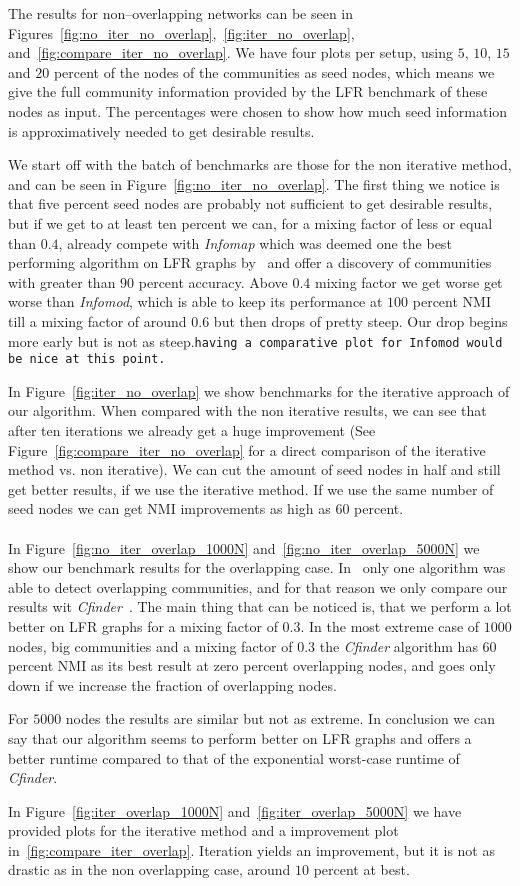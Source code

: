 The results for non--overlapping networks can be seen in Figures~\ref{fig:no_iter_no_overlap},~\ref{fig:iter_no_overlap}, and~\ref{fig:compare_iter_no_overlap}. We have four plots per setup, using $5$, $10$, $15$ and $20$ percent of the nodes of the communities as seed nodes, which means we give the full community information provided by the LFR benchmark of these nodes as input. The percentages were chosen to show how much seed information is approximatively needed to get desirable results.

We start off with the batch of benchmarks are those for the non iterative method, and can be seen in Figure~\ref{fig:no_iter_no_overlap}. The first thing we notice is that five percent seed nodes are probably not sufficient to get desirable results, but if we get to at least ten percent we can, for a mixing factor of less or equal than $0.4$, already compete with \textit{Infomap} which was deemed one the best performing algorithm on LFR graphs by~\cite{LF09} and offer a discovery of communities with greater than $90$ percent accuracy. Above $0.4$ mixing factor we get worse get worse than \textit{Infomod}, which is able to keep its performance at $100$ percent NMI till a mixing factor of around $0.6$ but then drops of pretty steep. Our drop begins more early but is not as steep.\texttt{having a comparative plot for Infomod would be nice at this point.}

In Figure~\ref{fig:iter_no_overlap} we show benchmarks for the iterative approach of our algorithm. When compared with the non iterative results, we can see that after ten iterations we already get a huge improvement (See Figure~\ref{fig:compare_iter_no_overlap} for a direct comparison of the iterative method vs. non iterative). We can cut the amount of seed nodes in half and still get better results, if we use the iterative method. If we use the same number of seed nodes we can get NMI improvements as high as $60$ percent.\\ \\
In Figure~\ref{fig:no_iter_overlap_1000N} and~\ref{fig:no_iter_overlap_5000N} we show our benchmark results for the overlapping case. In~\cite{LF09} only one algorithm was able to detect overlapping communities, and for that reason we only compare our results wit \textit{Cfinder}~\cite{PDFV05}. The main thing that can be noticed is, that we perform a lot better on LFR graphs for a mixing factor of $0.3$. In the most extreme case of $1000$ nodes, big communities and a mixing factor of $0.3$ the \textit{Cfinder} algorithm has $60$ percent NMI as its best result at zero percent overlapping nodes, and goes only down if we increase the fraction of overlapping nodes.

For $5000$ nodes the results are similar but not as extreme. In conclusion we can say that our algorithm seems to perform better on LFR graphs and offers a better runtime compared to that of the exponential worst-case runtime of \textit{Cfinder}.

In Figure~\ref{fig:iter_overlap_1000N} and~\ref{fig:iter_overlap_5000N} we have provided plots for the iterative method and a improvement plot in~\ref{fig:compare_iter_overlap}. Iteration yields an improvement, but it is not as drastic as in the non overlapping case, around $10$ percent at best.